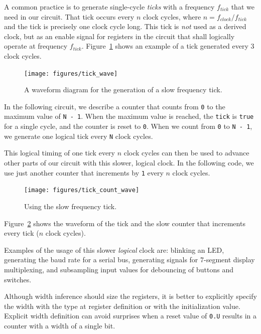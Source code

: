 \documentclass[%
    10pt,
    headinclude, footexclude,
    openright, %
    notitlepage,
    cleardoubleempty,
    headsepline,
    pointlessnumbers,
    bibtotoc, idxtotoc,
    ]{scrbook}
\newcommand{\code}[1]{{\small{\texttt{#1}}}}
\begin{document}
A common practice is to generate single-cycle \emph{ticks} with a frequency $f_{tick}$
that we need in our circuit. That tick occurs every $n$ clock cycles,
where $n = f_{clock}/f_{tick}$ and the tick is precisely one clock cycle long.
This tick is \emph{not} used as a derived clock, but as an enable signal for
registers in the circuit that shall logically operate at frequency $f_{tick}$.
Figure~\ref{fig:tick-wave} shows an example of a tick generated every
3 clock cycles.

\begin{figure}
  \centering
  \texttt{[image: figures/tick\_wave]}
  \caption{A waveform diagram for the generation of a slow frequency tick.}
  \label{fig:tick-wave}
\end{figure}


In the following circuit, we describe a counter that counts from \code{0}
to the maximum value of \code{N - 1}. When the maximum value is reached,
the \code{tick} is \code{true} for a single cycle, and the counter is reset to \code{0}.
When we count from \code{0} to \code{N - 1}, we generate one logical tick
every \code{N} clock cycles.


\noindent This logical timing of one tick every $n$ clock cycles can then be used
to advance other parts of our circuit with this slower, logical clock.
In the following code, we use just another counter that increments by \code{1}
every $n$ clock cycles.


\begin{figure}
  \centering
  \texttt{[image: figures/tick\_count\_wave]}
  \caption{Using the slow frequency tick.}
  \label{fig:tick-count-wave}
\end{figure}

\noindent Figure~\ref{fig:tick-count-wave} shows the waveform of the tick and the
slow counter that increments every tick ($n$ clock cycles).

Examples of the usage of this slower \emph{logical} clock are: blinking an LED,
generating the baud rate for a serial bus, generating signals for 7-segment
display multiplexing, and subsampling input values for debouncing of buttons
and switches. 

Although width inference should size the registers, it is better to explicitly
specify the width with the type at register definition or with the
initialization value. Explicit width definition can avoid surprises when a reset value of \code{0.U}
results in a counter with a width of a single bit.
\end{document}
